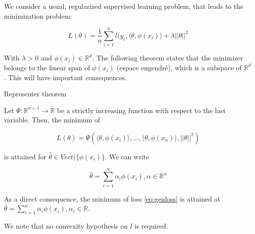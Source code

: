 \documentclass[
10pt, %
a4paper, %
oneside, %
headinclude,footinclude, %
BCOR5mm, %
]{scrartcl}
\begin{document}
We consider a usual, regularized supervised learning problem, that leads to the minimization problem:

\begin{equation}
    \label{eq:genloss}
    L( \theta) = \frac{1}{n} \sum^{n}_{i=1} l(y_i, \langle\theta,\phi(x_i)\rangle+\lambda ||\theta||^2
\end{equation}

With $\lambda>0$ and $\phi(x_i)\in \mathbb{R}^d$. The following theorem states that the minimizer belongs to the linear span of $\phi(x_i)$ (espace engendré), which is a subspace of $ \mathbb{R}^d$. This will have important consequences.

\begin{theorem}{Representer theorem}

    Let $\Psi : \mathbb{R}^{n+1}\rightarrow \mathbb{R} $ be a strictly increasing function with respect to the last variable. Then, the minimum of 

    \begin{equation*}
	L(\theta)  =\Psi(\langle\theta,\phi(x_i) \rangle, \dots, \langle\theta, \phi(x_n) \rangle, ||\theta||^2)
    \end{equation*}

    is attained for $ \hat{\theta}\in Vect(\{\phi(x_i)\}$. We can write
    
    \begin{equation*}
        \hat{\theta} = \sum^{n}_{i=1} \alpha_i\phi(x_i), \alpha\in \mathbb{R}^n
    \end{equation*}
\end{theorem}

\begin{corollary}
    As a direct consequence, the minimum of loss \ref{eq:genloss} is attained at $\hat{\theta} = \sum^{n}_{i=1} \alpha_i\phi(x_i), \alpha_i\in \mathbb{R}$.

    We note that no convexity hypothesis on $l$ is required.
\end{corollary}
\end{document}

